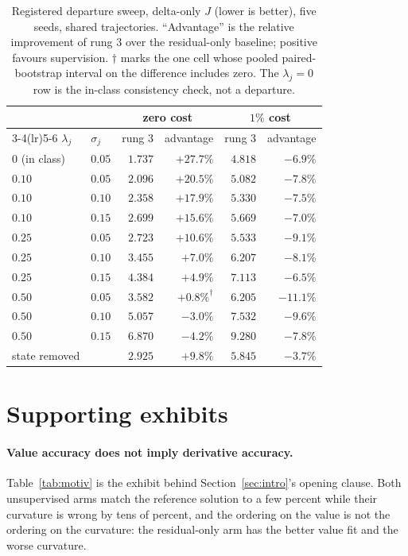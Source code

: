 \documentclass{article}
\begin{document}
\begin{table}[!htbp]
\caption{Registered departure sweep, delta-only $J$ (lower is better), five seeds,
shared trajectories. ``Advantage'' is the relative improvement of rung 3 over the
residual-only baseline; positive favours supervision. $\dagger$ marks the one cell
whose pooled paired-bootstrap interval on the difference includes zero. The
$\lambda_j = 0$ row is the in-class consistency check, not a departure.}
\label{tab:severity}
\centering\footnotesize\setlength{\tabcolsep}{5pt}
\begin{tabular}{@{}llrrrr@{}}
\toprule
& & \multicolumn{2}{c}{zero cost} & \multicolumn{2}{c}{$1\%$ cost} \\
\cmidrule(lr){3-4}\cmidrule(lr){5-6}
$\lambda_j$ & $\sigma_j$ & rung 3 & advantage & rung 3 & advantage \\
\midrule
$0$ (in class) & $0.05$ & $1.737$ & $+27.7\%$ & $4.818$ & $-6.9\%$ \\
\midrule
$0.10$ & $0.05$ & $2.096$ & $+20.5\%$ & $5.082$ & $-7.8\%$ \\
$0.10$ & $0.10$ & $2.358$ & $+17.9\%$ & $5.330$ & $-7.5\%$ \\
$0.10$ & $0.15$ & $2.699$ & $+15.6\%$ & $5.669$ & $-7.0\%$ \\
$0.25$ & $0.05$ & $2.723$ & $+10.6\%$ & $5.533$ & $-9.1\%$ \\
$0.25$ & $0.10$ & $3.455$ & $+7.0\%$ & $6.207$ & $-8.1\%$ \\
$0.25$ & $0.15$ & $4.384$ & $+4.9\%$ & $7.113$ & $-6.5\%$ \\
$0.50$ & $0.05$ & $3.582$ & $+0.8\%^{\dagger}$ & $6.205$ & $-11.1\%$ \\
$0.50$ & $0.10$ & $5.057$ & $-3.0\%$ & $7.532$ & $-9.6\%$ \\
$0.50$ & $0.15$ & $6.870$ & $-4.2\%$ & $9.280$ & $-7.8\%$ \\
\midrule
state removed & & $2.925$ & $+9.8\%$ & $5.845$ & $-3.7\%$ \\
\bottomrule
\end{tabular}
\end{table}

\section{Supporting exhibits}
\label{app:exhibits}

\paragraph{Value accuracy does not imply derivative accuracy.} Table~\ref{tab:motiv}
is the exhibit behind Section~\ref{sec:intro}'s opening clause. Both unsupervised
arms match the reference solution to a few percent while their curvature is wrong by
tens of percent, and the ordering on the value is not the ordering on the curvature:
the residual-only arm has the better value fit and the worse curvature.
\end{document}

